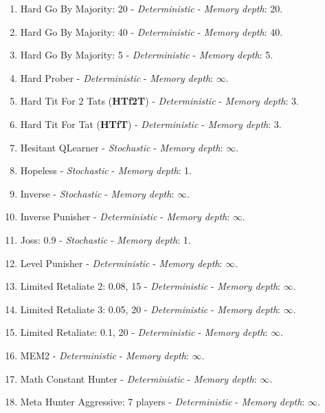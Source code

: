 \documentclass[10pt,letterpaper]{article}
\begin{document}
\begin{enumerate}
\item Hard Go By Majority: 20 - \textit{Deterministic} - \textit{Memory depth}: 20. \cite{axelrodproject}
\item Hard Go By Majority: 40 - \textit{Deterministic} - \textit{Memory depth}: 40. \cite{axelrodproject}
\item Hard Go By Majority: 5 - \textit{Deterministic} - \textit{Memory depth}: 5. \cite{axelrodproject}
\item Hard Prober - \textit{Deterministic} - \textit{Memory depth}: \(\infty\). \cite{Prison1998}
\item Hard Tit For 2 Tats (\textbf{HTf2T}) - \textit{Deterministic} - \textit{Memory depth}: 3. \cite{Stewart2012}
\item Hard Tit For Tat (\textbf{HTfT}) - \textit{Deterministic} - \textit{Memory depth}: 3. \cite{PD2017}
\item Hesitant QLearner - \textit{Stochastic} - \textit{Memory depth}: \(\infty\). \cite{axelrodproject}
\item Hopeless - \textit{Stochastic} - \textit{Memory depth}: 1. \cite{Berg2015}
\item Inverse - \textit{Stochastic} - \textit{Memory depth}: \(\infty\). \cite{axelrodproject}
\item Inverse Punisher - \textit{Deterministic} - \textit{Memory depth}: \(\infty\). \cite{axelrodproject}
\item Joss: 0.9 - \textit{Stochastic} - \textit{Memory depth}: 1. \cite{Axelrod1980, Stewart2012}
\item Level Punisher - \textit{Deterministic} - \textit{Memory depth}: \(\infty\). \cite{Eckhart2015}
\item Limited Retaliate 2: 0.08, 15 - \textit{Deterministic} - \textit{Memory depth}: \(\infty\). \cite{axelrodproject}
\item Limited Retaliate 3: 0.05, 20 - \textit{Deterministic} - \textit{Memory depth}: \(\infty\). \cite{axelrodproject}
\item Limited Retaliate: 0.1, 20 - \textit{Deterministic} - \textit{Memory depth}: \(\infty\). \cite{axelrodproject}
\item MEM2 - \textit{Deterministic} - \textit{Memory depth}: \(\infty\). \cite{Li2014}
\item Math Constant Hunter - \textit{Deterministic} - \textit{Memory depth}: \(\infty\). \cite{axelrodproject}
\item Meta Hunter Aggressive: 7 players - \textit{Deterministic} - \textit{Memory depth}: \(\infty\). \cite{axelrodproject}

\end{enumerate}
\end{document}
